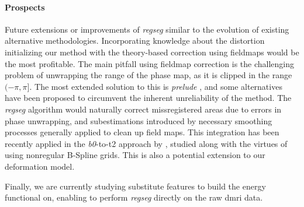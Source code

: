 \paragraph*{Prospects}
Future extensions or improvements of \emph{regseg} similar to the evolution of existing
  alternative methodologies.
Incorporating knowledge about the distortion initializing our method with the theory-based
  correction using fieldmaps would be the most profitable.
The main pitfall using fieldmap correction is the challenging problem of unwrapping the
  range of the phase map, as it is clipped in the range $(-\pi, \pi]$.
The most extended solution to this is \emph{prelude} \citep{jenkinson_fast_2003}, and some
  alternatives have been proposed \citep{zhou_reliable_2009,daga_susceptibility_2014} to
  circumvent the inherent unreliability of the method.
The \emph{regseg} algorithm would naturally correct missregistered areas due to errors in
  phase unwrapping, and subestimations introduced by necessary smoothing processes generally
  applied to clean up field maps.
This integration has been recently applied in the \emph{b0}-to-\gls*{t2} approach
  by \cite{irfanoglu_susceptibility_2011}, studied along with the virtues of using
  nonregular B-Spline grids.
This is also a potential extension to our deformation model.

Finally, we are currently studying substitute features to build the energy functional on,
  enabling to perform \emph{regseg} directly on the raw \gls*{dmri} data.